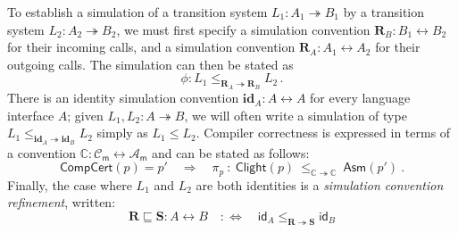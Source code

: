 \documentclass[acmsmall,screen,review,anonymous]{acmart}
\newcommand{\kw}[1]{\ensuremath{ \mathsf{#1} }}
\newcommand{\idsc}{\mathbf{id}} %
\begin{document}
To establish a simulation
of a transition system $L_1: A_1 \twoheadrightarrow B_1$
by a transition system $L_2: A_2 \twoheadrightarrow B_2$,
we must first specify a simulation convention
$\mathbf{R}_B : B_1 \leftrightarrow B_2$
for their incoming calls,
and a simulation convention
$\mathbf{R}_A : A_1 \leftrightarrow A_2$
for their outgoing calls.
The simulation can then be stated as
\[
  \phi : L_1 \le_{\mathbf{R}_A \twoheadrightarrow \mathbf{R}_B} L_2
  \,.
\]
There is an identity simulation convention $\idsc_A : A \leftrightarrow A$
for every language interface $A$;
given $L_1, L_2 : A \twoheadrightarrow B$,
we will often write
a simulation of type $L_1 \le_{\idsc_A \twoheadrightarrow \idsc_B} L_2$
simply as $L_1 \le L_2$.
%
Compiler correctness
is expressed in terms of a convention
$\mathbb{C} : \mathcal{C}_\kw{m} \leftrightarrow \mathcal{A}_\kw{m}$
and can be stated as follows:
\[
  \kw{CompCert}(p) = p'
  \quad \Rightarrow \quad
  \pi_p \::\:
  \kw{Clight}(p)
  \:\le_{\mathbb{C} \twoheadrightarrow \mathbb{C}}\:
  \kw{Asm}(p')
  \:.
\]
Finally, the case where $L_1$ and $L_2$ are both identities
is a \emph{simulation convention refinement}, written:
\[
  \mathbf{R} \sqsubseteq \mathbf{S} : A \leftrightarrow B
  \quad :\Leftrightarrow \quad
  \kw{id}_A \le_{\mathbf{R} \twoheadrightarrow \mathbf{S}} \kw{id}_B
\]

\end{document}

